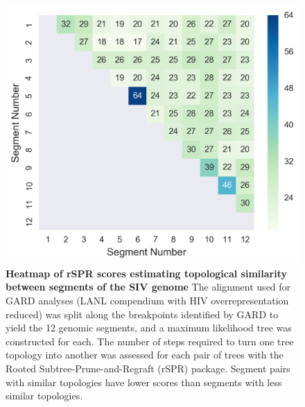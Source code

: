 \begin{figure}[h!]
  \begin{centering}
    \includegraphics[width=.8\linewidth]{./png/siv_rspr.png}
  	\caption[Topological similarity between segments of the SIV genome]{\textbf{Heatmap of rSPR scores estimating topological similarity between segments of the SIV genome }
The alignment used for GARD analyses (LANL compendium with HIV overrepresentation reduced) was split along the breakpoints identified by GARD to yield the 12 genomic segments, and a maximum likelihood tree was constructed for each.
The number of steps required to turn one tree topology into another was assessed for each pair of trees with the Rooted Subtree-Prune-and-Regraft (rSPR) package. Segment pairs with similar topologies have lower scores than segments with less similar topologies.
        }
  	\label{siv_rspr}
  \end{centering}
\end{figure}

